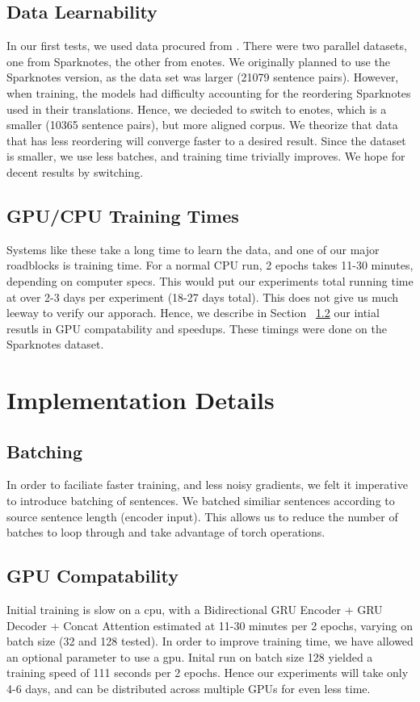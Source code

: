 \documentclass[twoside,twocolumn]{article}
\begin{document}
\subsection{Data Learnability}
In our first tests, we used data procured from \cite{xu2012paraphrasing}.
There were two parallel datasets, one from Sparknotes, the other from enotes. We
originally planned to use the Sparknotes version, as the data set was larger
(21079 sentence pairs). However, when training, the models had difficulty
accounting for the reordering Sparknotes used in their translations. Hence, we
decieded to switch to enotes, which is a smaller (10365 sentence pairs), but
more aligned corpus. We theorize that data that has less reordering will converge
faster to a desired result. Since the dataset is smaller, we use less batches,
and training time trivially improves. We hope for decent results by switching.


\subsection{GPU/CPU Training Times}
Systems like these take a long time to learn the data, and one of our major
roadblocks is training time. For a normal CPU run, 2 epochs takes 11-30 minutes,
depending on computer specs. This would put our experiments total running time
at over 2-3 days per experiment (18-27 days total). This does not give us much
leeway to verify our
apporach. Hence, we describe in Section ~\ref{sec:gpu} our intial resutls
in GPU compatability and speedups. These timings were done on the Sparknotes
dataset.


\section{Implementation Details}
\subsection{Batching}
In order to faciliate faster training, and less noisy gradients, we felt it
imperative to introduce batching of sentences. We batched similiar sentences
according to source sentence length (encoder input). This allows us to reduce
the number of batches to loop through and take advantage of torch operations.

\subsection{GPU Compatability}
\label{sec:gpu}
Initial training is slow on a cpu, with a Bidirectional GRU Encoder
+ GRU Decoder + Concat Attention estimated at 11-30 minutes per 2 epochs,
varying on batch size (32 and 128 tested). In order to improve training time,
we have allowed an optional parameter to use a gpu. Inital run on batch size 128
yielded a training speed of 111 seconds per 2 epochs. Hence our experiments will
take only 4-6 days, and can be distributed across multiple GPUs for even less
time.
\end{document}
